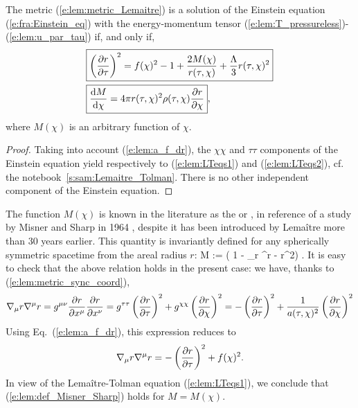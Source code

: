 \begin{prop}
The metric (\ref{e:lem:metric_Lemaitre}) is a solution of the
Einstein equation (\ref{e:fra:Einstein_eq}) with the energy-momentum tensor (\ref{e:lem:T_pressureless})-(\ref{e:lem:u_par_tau}) if, and only if,
\begin{subequations}\label{e:lem:LTeqs}
\begin{align}
 & \fbox{$\displaystyle \left( \frac{\partial r}{\partial \tau} \right) ^2 = f(\chi)^2 - 1 + \frac{2M(\chi)}{r(\tau,\chi)}
   + \frac{\Lambda}{3} r(\tau,\chi)^2 $} \label{e:lem:LTeqs1} \\
 & \fbox{$\displaystyle \frac{\mathrm{d} M}{\mathrm{d}\chi} = 4\pi r(\tau,\chi)^2 \rho(\tau,\chi) \frac{\partial r}{\partial \chi} $} ,
    \label{e:lem:LTeqs2}
 \end{align}
\end{subequations}
where $M(\chi)$ is an arbitrary function of $\chi$.
\end{prop}
\begin{proof}
Taking into account (\ref{e:lem:a_f_dr}), the $\chi\chi$ and $\tau\tau$ components of the Einstein equation
yield respectively to (\ref{e:lem:LTeqs1}) and (\ref{e:lem:LTeqs2}), cf. the notebook~\ref{s:sam:Lemaitre_Tolman}.
There is no other independent component of the Einstein equation.
\end{proof}

The function $M(\chi)$ is known in the literature as the  or , in reference
of a study by Misner and Sharp in 1964 \cite{MisneS64}, despite it has been introduced
by Lemaître \cite{Lemai32} more than 30 years earlier. This quantity is
invariantly defined for any spherically symmetric spacetime from the areal radius $r$:
\be \label{e:lem:def_Misner_Sharp}
    M  :=  \left( 1 - \nabla_\mu r \nabla^\mu r  -  r^2\right) .
\ee
It is easy to check that the above relation holds in the present case:
we have, thanks to (\ref{e:lem:metric_sync_coord}),
\[
    \nabla_\mu r \nabla^\mu r = g^{\mu\nu} \frac{\partial r}{\partial x^\mu} \frac{\partial r}{\partial x^\nu}
        = g^{\tau\tau} \left( \frac{\partial r}{\partial \tau} \right)^2
        + g^{\chi\chi} \left( \frac{\partial r}{\partial \chi} \right)^2
        = - \left( \frac{\partial r}{\partial \tau} \right)^2 + \frac{1}{a(\tau,\chi)^2} \left( \frac{\partial r}{\partial \chi} \right)^2
\]
Using Eq.~(\ref{e:lem:a_f_dr}), this expression reduces to
\[
    \nabla_\mu r \nabla^\mu r = - \left( \frac{\partial r}{\partial \tau} \right)^2 + f(\chi)^2 .
\]
In view of the Lemaître-Tolman equation (\ref{e:lem:LTeqs1}), we conclude that
(\ref{e:lem:def_Misner_Sharp}) holds for $M = M(\chi)$.

